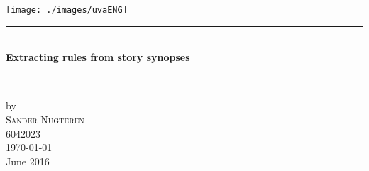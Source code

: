 \documentclass{beamer}
\begin{document}
	\begin{frame}
		\newcommand{\HRule}{\rule{\linewidth}{0.5mm}} %
		\center %
		

		\texttt{[image: ./images/uvaENG]}\\%


		\HRule \\%
		{ \huge \bfseries Extracting rules from story synopses}\\%
		\HRule \\%
		

		by\\[0.2cm]
		\textsc{\Large Sander Nugteren}\\[0.2cm] %
		6042023\\[0.2cm]



		{\Large \today}\\[0.5cm] %

		June 2016\\


\end{frame}
\end{document}

